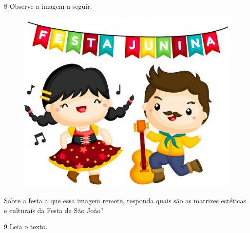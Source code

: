 
\pagebreak
\num{8}  Observe a imagem a seguir.

\begin{figure}[htpb!]
\centering
\includegraphics[width=\textwidth]{./imgs/art42.png}
\end{figure}

\noindent{}Sobre a festa a que essa imagem remete, responda quais são as matrizes estéticas e culturais da Festa de São João?



\num{9} Leia o texto.

